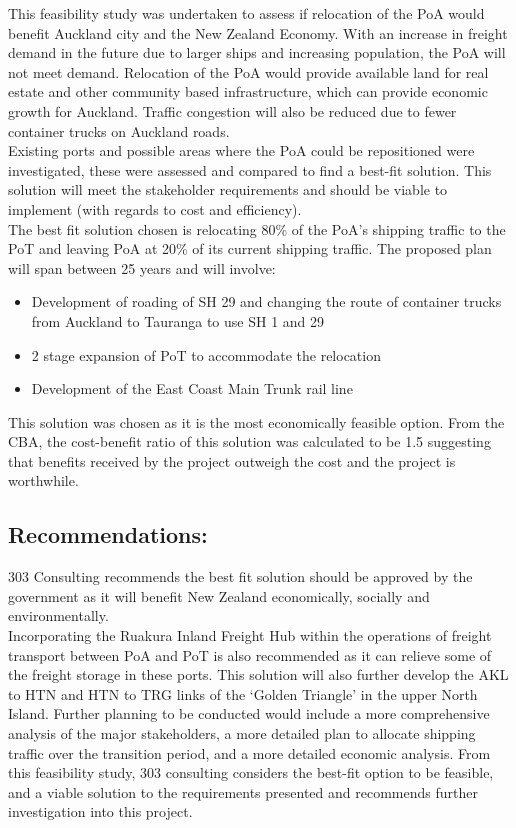 This feasibility study was undertaken to assess if relocation of the PoA would benefit Auckland city and the New Zealand Economy. With an increase in freight demand in the future due to larger ships and increasing population, the PoA will not meet demand. Relocation of the PoA would provide available land for real estate and other community based infrastructure, which can provide economic growth for Auckland. Traffic congestion will also be reduced due to fewer container trucks on Auckland roads. 
\\Existing ports and possible areas where the PoA could be repositioned were investigated, these were assessed and compared to find a best-fit solution. This solution will meet the stakeholder requirements and should be viable to implement (with regards to cost and efficiency).
\\The best fit solution chosen is relocating 80\% of the PoA’s shipping traffic to the PoT and leaving PoA at 20\% of its current shipping traffic. The proposed plan will span between 25 years and will involve:
\begin{itemize}[noitemsep]
    \vspace{-2mm}
    \item{Development of roading of SH 29 and changing the route of container trucks from Auckland to Tauranga to use SH 1 and 29}
    \item{2 stage expansion of PoT to accommodate the relocation}
    \item{Development of the East Coast Main Trunk rail line}
\end{itemize}
This solution was chosen as it is the most economically feasible option. From the CBA, the cost-benefit ratio of this solution was calculated to be 1.5 suggesting that benefits received by the project outweigh the cost and the project is worthwhile.
\subsection*{Recommendations:}
303 Consulting recommends the best fit solution should be approved by the government as it will benefit New Zealand economically, socially and environmentally. 
\\Incorporating the Ruakura Inland Freight Hub within the operations of freight transport between PoA and PoT is also recommended as it can relieve some of the freight storage in these ports. This solution will also further develop the AKL to HTN and HTN to TRG links of the ‘Golden Triangle’ in the upper North Island. Further planning to be conducted would include a more comprehensive analysis of the major stakeholders, a more detailed plan to allocate shipping traffic over the transition period, and a more detailed economic analysis. From this feasibility study, 303 consulting considers the best-fit option to be feasible, and a viable solution to the requirements presented and recommends further investigation into this project.

\clearpage